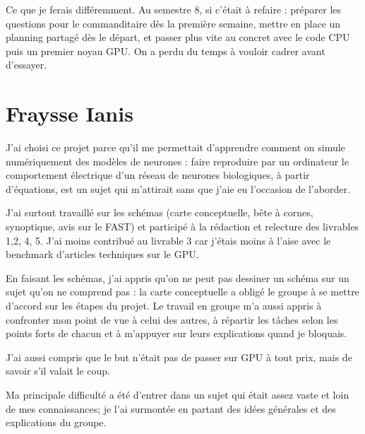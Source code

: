 \documentclass{report}
\begin{document}
Ce que je ferais différemment. Au semestre 8, si c’était à refaire : préparer les questions pour
le commanditaire dès la première semaine, mettre en place un planning partagé dès le départ, et passer plus vite au concret avec le code CPU puis un premier noyau GPU. On a perdu du temps à
vouloir cadrer avant d’essayer.

\chapter{Fraysse Ianis}
J’ai choisi ce projet parce qu’il me permettait d’apprendre comment on simule numériquement des modèles de neurones : faire reproduire par un ordinateur le comportement électrique d’un réseau de neurones biologiques, à partir d’équations, est un sujet qui m’attirait sans que j’aie eu l’occasion de l’aborder.

J’ai surtout travaillé sur les schémas (carte conceptuelle, bête à cornes, synoptique, avis sur le FAST) et participé à la rédaction et relecture des livrables 1,2, 4, 5. J’ai moins contribué au livrable 3 car j’étais moins à l’aise avec le benchmark d’articles techniques sur le GPU.

En faisant les schémas, j’ai appris qu’on ne peut pas dessiner un schéma sur un sujet qu’on ne comprend pas : la carte conceptuelle a obligé le groupe à se mettre d’accord sur les étapes du projet. Le travail en groupe m’a aussi appris à confronter mon point de vue à celui des autres, à répartir les tâches selon les points forts de chacun et à m’appuyer sur leurs explications quand je bloquais.

J’ai aussi compris que le but n’était pas de passer sur GPU à tout prix, mais de savoir s’il valait le coup.

Ma principale difficulté a été d’entrer dans un sujet qui était assez vaste et loin de mes connaissances; je l’ai surmontée en partant des idées générales et des explications du groupe. 
\end{document}

